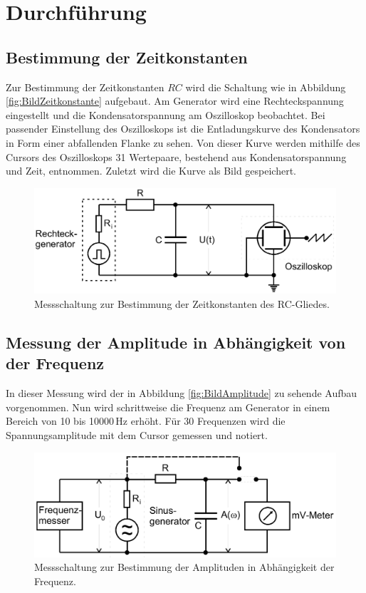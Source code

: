 \section{Durchführung}

\subsection{Bestimmung der Zeitkonstanten}
Zur Bestimmung der Zeitkonstanten $RC$ wird die Schaltung wie in Abbildung \eqref{fig:BildZeitkonstante} aufgebaut.
Am Generator wird eine Rechteckspannung eingestellt und die Kondensatorspannung am Oszilloskop beobachtet. Bei passender Einstellung
des Oszilloskops ist die Entladungskurve des Kondensators in Form einer abfallenden Flanke zu sehen.
Von dieser Kurve werden mithilfe des Cursors des Oszilloskops 31 Wertepaare, bestehend aus Kondensatorspannung und Zeit, entnommen. Zuletzt
wird die Kurve als Bild gespeichert.

\begin{figure}[h!]
\centering
\includegraphics[scale=.45]{Schaltung_Zeitkonstante.png}
\caption{Messschaltung zur Bestimmung der Zeitkonstanten des RC-Gliedes.}
\label{fig:BildZeitkonstante}
\end{figure}

\subsection{Messung der Amplitude in Abhängigkeit von der Frequenz}
In dieser Messung wird der in Abbildung \eqref{fig:BildAmplitude} zu sehende Aufbau vorgenommen. Nun wird schrittweise die Frequenz am Generator in 
einem Bereich von 10 bis 10000\,Hz erhöht. Für 30 Frequenzen wird die Spannungsamplitude mit dem Cursor gemessen und notiert.
\begin{figure}[h!]
\centering
\includegraphics[scale=.45]{Schaltung_Amplitude.png}
\caption{Messschaltung zur Bestimmung der Amplituden in Abhängigkeit der Frequenz.}
\label{fig:BildAmplitude}
\end{figure}

